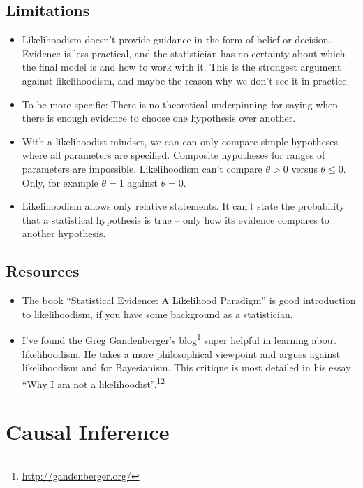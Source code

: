 \documentclass[
  10pt,
]{scrbook}
\providecommand{\tightlist}{%
  \setlength{\itemsep}{0pt}\setlength{\parskip}{0pt}}
\renewcommand{\href}[2]{#2\footnote{\url{#1}}}
\begin{document}
\hypertarget{limitations-3}{%
\section{Limitations}\label{limitations-3}}

\begin{itemize}
\tightlist
\item
  Likelihoodism doesn't provide guidance in the form of belief or decision. Evidence is less practical, and the statistician has no certainty about which the final model is and how to work with it. This is the strongest argument against likelihoodism, and maybe the reason why we don't see it in practice.
\item
  To be more specific: There is no theoretical underpinning for saying when there is enough evidence to choose one hypothesis over another.
\item
  With a likelihoodist mindset, we can can only compare simple hypotheses where all parameters are specified. Composite hypotheses for ranges of parameters are impossible. Likelihoodism can't compare \(\theta > 0\) versus \(\theta \leq 0\). Only, for example \(\theta = 1\) against \(\theta = 0\).
\item
  Likelihoodism allows only relative statements. It can't state the probability that a statistical hypothesis is true -- only how its evidence compares to another hypothesis.
\end{itemize}

\hypertarget{resources}{%
\section{Resources}\label{resources}}

\begin{itemize}
\tightlist
\item
  The book ``Statistical Evidence: A Likelihood Paradigm'' is good introduction to likelihoodism, if you have some background as a statistician.
\item
  I've found the \href{http://gandenberger.org/}{Greg Gandenberger's blog} super helpful in learning about likelihoodism. He takes a more philosophical viewpoint and argues against likelihoodism and for Bayesianism. This critique is most detailed in his essay ``Why I am not a likelihoodist''.\textsuperscript{\protect\hyperlink{ref-gandenberger2016not}{12}}
\end{itemize}

\hypertarget{causal-inference}{%
\chapter{Causal Inference}\label{causal-inference}}
\end{document}
